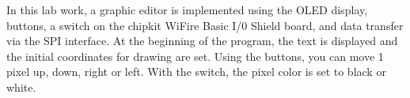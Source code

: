 In this lab work, a graphic editor is implemented using the O\+L\+ED display, buttons, a switch on the chipkit Wi\+Fire Basic I/0 Shield board, and data transfer via the S\+PI interface. At the beginning of the program, the text is displayed and the initial coordinates for drawing are set. Using the buttons, you can move 1 pixel up, down, right or left. With the switch, the pixel color is set to black or white. 